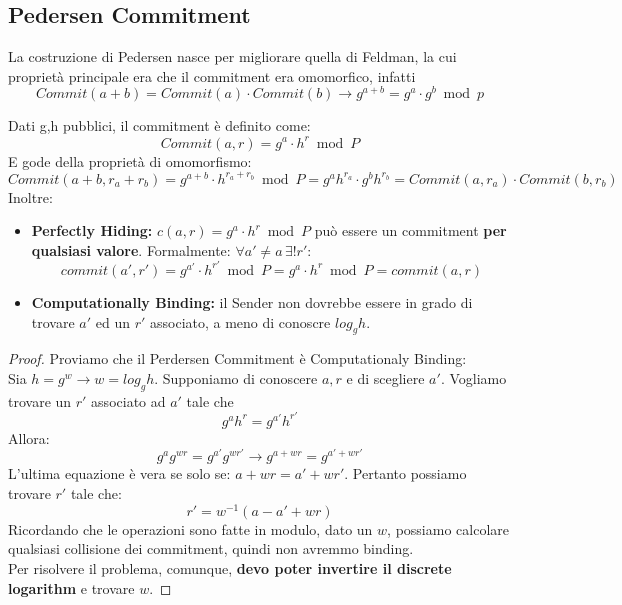 \subsection{Pedersen Commitment}
La costruzione di Pedersen nasce per migliorare quella di Feldman, la cui proprietà principale era che il commitment era omomorfico, infatti 
\[Commit(a+b)=Commit(a)\cdot Commit(b)\rightarrow g^{a+b}=g^a\cdot g^b\bmod p\]
\begin{theorem}\label{thm:pedersen}
Dati g,h pubblici, il commitment è definito come:
\begin{equation}\label{eq:pedersen}
    Commit(a,r)=g^a\cdot h^r\bmod P
\end{equation}
E gode della proprietà di omomorfismo:
\[    Commit(a+b,r_a+r_b)=g^{a+b}\cdot h^{r_a+r_b}\bmod P=g^{a}h^{r_a}\cdot g^{b}h^{r_b}=Commit(a,r_a)\cdot Commit(b,r_b)
\]
Inoltre:
\begin{itemize}
    \item \textbf{Perfectly Hiding:} $c(a,r)=g^a\cdot h^r\bmod P$ può essere un commitment \textbf{per qualsiasi valore}. Formalmente: $\forall a'\ne a\,\exists !r':$ 
    \[commit(a',r')=g^{a'}\cdot h^{r'}\bmod P=g^a\cdot h^r\bmod P=commit(a,r)\]
    \item \textbf{Computationally Binding:} il Sender non dovrebbe essere in grado di trovare $a'$ ed un $r'$ associato, a meno di conoscre $log_g h$. 
\end{itemize}
\end{theorem}
\begin{proof}Proviamo che il Perdersen Commitment è Computationaly Binding:\\
Sia $h=g^w\rightarrow w=log_g h$. Supponiamo di conoscere $a,r$ e di scegliere $a'$. Vogliamo trovare un $r'$ associato ad $a'$ tale che
\begin{equation}\label{eq:proof}
    g^ah^r=g^{a'}h^{r'}
\end{equation}
Allora:
\begin{equation*}
    g^ag^{wr}=g^{a'}g^{wr'}\rightarrow     g^{a+wr}=g^{a'+wr'}
\end{equation*}
L'ultima equazione è vera se solo se: $a+wr=a'+wr'$. Pertanto possiamo trovare $r'$ tale che:
\[r'=w^{-1}(a-a'+wr)\]
Ricordando che le operazioni sono fatte in modulo, dato un $w$, possiamo calcolare qualsiasi collisione dei commitment, quindi non avremmo binding.\\
Per risolvere il problema, comunque, \textbf{devo poter invertire il discrete logarithm} e trovare $w$.
\end{proof}\pagebreak

